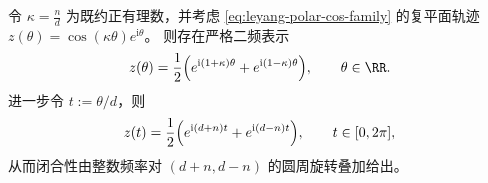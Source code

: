 \begin{remark}\label{rem:leyang-polar-complex-lissajous}
令 \(\kappa=\frac{n}{d}\) 为既约正有理数，并考虑 \eqref{eq:leyang-polar-cos-family} 的复平面轨迹 \(z(\theta)=\cos(\kappa\theta)e^{\mathrm{i}\theta}\)。
则存在严格二频表示
\[
z(\theta)=\frac12\Bigl(e^{\mathrm{i}(1+\kappa)\theta}+e^{\mathrm{i}(1-\kappa)\theta}\Bigr),
\qquad \theta\in\RR.
\]
进一步令 \(t:=\theta/d\)，则
\[
z(t)=\frac12\Bigl(e^{\mathrm{i}(d+n)t}+e^{\mathrm{i}(d-n)t}\Bigr),
\qquad t\in[0,2\pi],
\]
从而闭合性由整数频率对 \((d+n,d-n)\) 的圆周旋转叠加给出。
\end{remark}

\endinput
